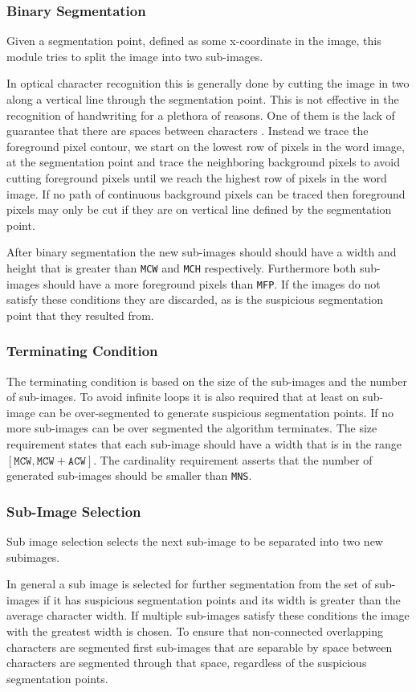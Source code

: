 \subsubsection{Binary Segmentation}
	\label{sss:method:segmentation:binarySegmentation}
	Given a segmentation point, defined as some x-coordinate in the image, this module tries to split the image into two sub-images. 

	In optical character recognition this is generally done by cutting the image in two along a vertical line through the segmentation point. This is not effective in the recognition of handwriting for a plethora of reasons. One of them is the lack of guarantee that there are spaces between characters \cite{lee2012binary}. Instead we trace the foreground pixel contour, we start on the lowest row of pixels in the word image, at the segmentation point and trace the neighboring background pixels to avoid cutting foreground pixels until we reach the highest row of pixels in the word image. If no path of continuous background pixels can be traced then foreground pixels may only be cut if they are on vertical line defined by the segmentation point. 

	After binary segmentation the new sub-images should should have a width and height that is greater than \texttt{MCW} and \texttt{MCH} respectively. Furthermore both sub-images should have a more foreground pixels than \texttt{MFP}. If the images do not satisfy these conditions they are discarded, as is the suspicious segmentation point that they resulted from. 

\subsubsection{Terminating Condition}
	\label{sss:method:segmentation:terminatingCondition}
	The terminating condition is based on the size of the sub-images and the number of sub-images. To avoid infinite loops it is also required that at least on sub-image can be over-segmented to generate suspicious segmentation points. If no more sub-images can be over segmented the algorithm terminates. The size requirement states that each sub-image should have a width that is in the range $[\mathtt{MCW}, \mathtt{MCW} + \mathtt{ACW}]$. The cardinality requirement asserts that the number of generated sub-images should be smaller than \texttt{MNS}.

\subsubsection{Sub-Image Selection}
	\label{sss:method:segmentation:subImageSelection}
	Sub image selection selects the next sub-image to be separated into two new subimages.

	In general a sub image is selected for further segmentation from the set of sub-images if it has suspicious segmentation points and its width is greater than the average character width. If multiple sub-images satisfy these conditions the image with the greatest width is chosen. To ensure that non-connected overlapping characters are segmented first sub-images that are separable by space between characters are segmented through that space, regardless of the suspicious segmentation points.